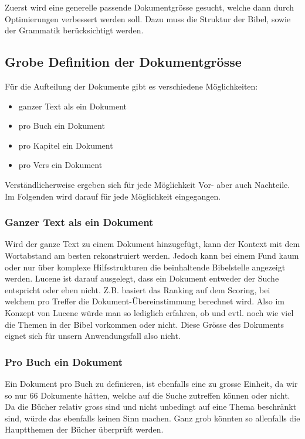 Zuerst wird eine generelle passende Dokumentgrösse gesucht, welche dann durch Optimierungen verbessert werden soll.
Dazu muss die Struktur der Bibel, sowie der Grammatik berücksichtigt werden.

\subsection{Grobe Definition der Dokumentgrösse}
Für die Aufteilung der Dokumente gibt es verschiedene Möglichkeiten:
\begin{itemize}
	\item ganzer Text als ein Dokument
	\item pro Buch ein Dokument
	\item pro Kapitel ein Dokument
	\item pro Vers ein Dokument
\end{itemize}

Verständlicherweise ergeben sich für jede Möglichkeit Vor- aber auch Nachteile.
Im Folgenden wird darauf für jede Möglichkeit eingegangen.

\subsubsection{Ganzer Text als ein Dokument}
Wird der ganze Text zu einem Dokument hinzugefügt, kann der Kontext mit dem Wortabstand am besten rekonstruiert werden.
Jedoch kann bei einem Fund kaum oder nur über komplexe Hilfsstrukturen die beinhaltende Bibelstelle angezeigt werden.
Lucene ist darauf ausgelegt, dass ein Dokument entweder der Suche entspricht oder eben nicht.
Z.B. basiert das Ranking auf dem Scoring, bei welchem pro Treffer die Dokument-Übereinstimmung berechnet wird.
Also im Konzept von Lucene würde man so lediglich erfahren, ob und evtl. noch wie viel die Themen in der Bibel vorkommen oder nicht.
Diese Grösse des Dokuments eignet sich für unsern Anwendungsfall also nicht.

\subsubsection{Pro Buch ein Dokument}
Ein Dokument pro Buch zu definieren, ist ebenfalls eine zu grosse Einheit, da wir so nur 66 Dokumente hätten, welche auf die Suche zutreffen können oder nicht.
Da die Bücher relativ gross sind und nicht unbedingt auf eine Thema beschränkt sind, würde das ebenfalls keinen Sinn machen.
Ganz grob könnten so allenfalls die Hauptthemen der Bücher überprüft werden.


